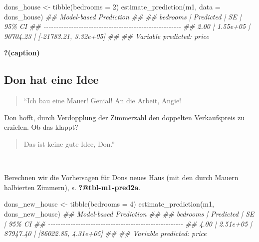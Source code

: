 \documentclass[
  a4paper,
  DIV=11]{scrreprt}
\newenvironment{Shaded}{\begin{snugshade}}{\end{snugshade}}
\newcommand{\AttributeTok}[1]{\textcolor[rgb]{0.40,0.45,0.13}{#1}}
\newcommand{\DecValTok}[1]{\textcolor[rgb]{0.68,0.00,0.00}{#1}}
\newcommand{\DocumentationTok}[1]{\textcolor[rgb]{0.37,0.37,0.37}{\textit{#1}}}
\newcommand{\FunctionTok}[1]{\textcolor[rgb]{0.28,0.35,0.67}{#1}}
\newcommand{\NormalTok}[1]{\textcolor[rgb]{0.00,0.23,0.31}{#1}}
\newcommand{\OtherTok}[1]{\textcolor[rgb]{0.00,0.23,0.31}{#1}}
\theoremstyle{definition}
\theoremstyle{remark}
\begin{document}
\begin{Shaded}
\begin{Highlighting}[]
\NormalTok{dons\_house }\OtherTok{\textless{}{-}} \FunctionTok{tibble}\NormalTok{(}\AttributeTok{bedrooms =} \DecValTok{2}\NormalTok{)}
\FunctionTok{estimate\_prediction}\NormalTok{(m1, }\AttributeTok{data =}\NormalTok{ dons\_house)}
\DocumentationTok{\#\# Model{-}based Prediction}
\DocumentationTok{\#\# }
\DocumentationTok{\#\# bedrooms | Predicted |       SE |                95\% CI}
\DocumentationTok{\#\# {-}{-}{-}{-}{-}{-}{-}{-}{-}{-}{-}{-}{-}{-}{-}{-}{-}{-}{-}{-}{-}{-}{-}{-}{-}{-}{-}{-}{-}{-}{-}{-}{-}{-}{-}{-}{-}{-}{-}{-}{-}{-}{-}{-}{-}{-}{-}{-}{-}{-}{-}{-}{-}{-}{-}}
\DocumentationTok{\#\# 2.00     |  1.55e+05 | 90704.23 | [{-}21783.21, 3.32e+05]}
\DocumentationTok{\#\# }
\DocumentationTok{\#\# Variable predicted: price}
\end{Highlighting}
\end{Shaded}

\begin{table}

\caption{\textbf{?(caption)}}

\end{table}

\hypertarget{don-hat-eine-idee}{%
\subsection{Don hat eine Idee}\label{don-hat-eine-idee}}

\begin{quote}
``Ich bau eine Mauer! Genial! An die Arbeit, Angie! 🧑
\end{quote}

Don hofft, durch Verdopplung der Zimmerzahl den doppelten Verkaufspreis
zu erzielen. Ob das klappt?

\begin{quote}
Das ist keine gute Idee, Don.''
\end{quote}

👩

Berechnen wir die Vorhersagen für Dons neues Haus (mit den durch Mauern
halbierten Zimmern), s. \textbf{?@tbl-m1-pred2a}.

\begin{Shaded}
\begin{Highlighting}[]
\NormalTok{dons\_new\_house }\OtherTok{\textless{}{-}} \FunctionTok{tibble}\NormalTok{(}\AttributeTok{bedrooms =} \DecValTok{4}\NormalTok{)}
\FunctionTok{estimate\_prediction}\NormalTok{(m1, dons\_new\_house)}
\DocumentationTok{\#\# Model{-}based Prediction}
\DocumentationTok{\#\# }
\DocumentationTok{\#\# bedrooms | Predicted |       SE |               95\% CI}
\DocumentationTok{\#\# {-}{-}{-}{-}{-}{-}{-}{-}{-}{-}{-}{-}{-}{-}{-}{-}{-}{-}{-}{-}{-}{-}{-}{-}{-}{-}{-}{-}{-}{-}{-}{-}{-}{-}{-}{-}{-}{-}{-}{-}{-}{-}{-}{-}{-}{-}{-}{-}{-}{-}{-}{-}{-}{-}}
\DocumentationTok{\#\# 4.00     |  2.51e+05 | 87947.40 | [86022.85, 4.31e+05]}
\DocumentationTok{\#\# }
\DocumentationTok{\#\# Variable predicted: price}
\end{Highlighting}
\end{Shaded}
\end{document}
